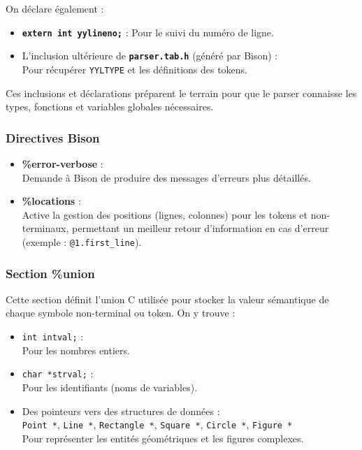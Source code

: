 \documentclass[12pt,a4paper]{article}
\begin{document}
On déclare également :
\begin{itemize}
    \item \textbf{\texttt{extern int yylineno;}} : Pour le suivi du numéro de ligne.
    \item L’inclusion ultérieure de \textbf{\texttt{parser.tab.h}} (généré par Bison) : \\
    Pour récupérer \texttt{YYLTYPE} et les définitions des tokens.
\end{itemize}

Ces inclusions et déclarations préparent le terrain pour que le parser connaisse les types, fonctions et variables globales nécessaires.

\subsubsection{Directives Bison}
\begin{itemize}
    \item \textbf{\%error-verbose} : \\
    Demande à Bison de produire des messages d’erreurs plus détaillés.

    \item \textbf{\%locations} : \\
    Active la gestion des positions (lignes, colonnes) pour les tokens et non-terminaux, permettant un meilleur retour d’information en cas d’erreur (exemple : \texttt{@1.first\_line}).
\end{itemize}

\subsubsection{Section \%union}

Cette section définit l’union C utilisée pour stocker la valeur sémantique de chaque symbole non-terminal ou token. On y trouve :

\begin{itemize}
    \item \texttt{int intval;} : \\
    Pour les nombres entiers.

    \item \texttt{char *strval;} : \\
    Pour les identifiants (noms de variables).

    \item Des pointeurs vers des structures de données : \\
    \texttt{Point *}, \texttt{Line *}, \texttt{Rectangle *}, \texttt{Square *}, \texttt{Circle *}, \texttt{Figure *} \\
    Pour représenter les entités géométriques et les figures complexes.

    
\end{itemize}
\end{document}
